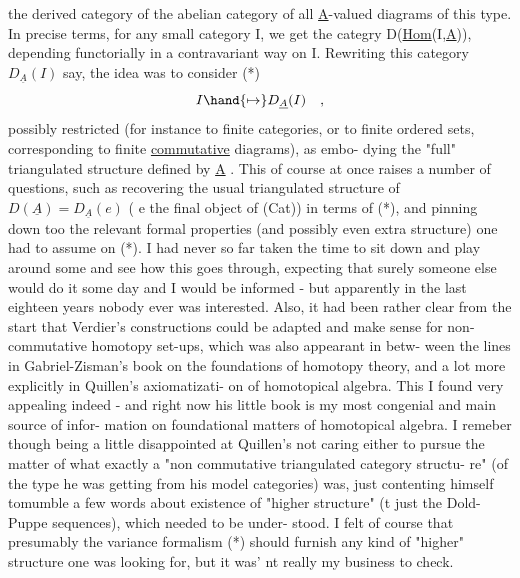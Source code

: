  the derived category of the abelian category of all \underline{A}-valued diagrams
of this type. In precise terms, for any small category I, we get
the categry D(\underline{Hom}(I,\underline{A})), depending functorially in a contravariant
way on I. Rewriting this category $D_{\underline{A}}(I)$ say, the idea was to consider
(*) \[ I \hand{\mapsto} D_{\underline{A}}(I) \quad , \]
possibly  restricted  (for instance to finite categories, or to finite
ordered sets, corresponding to finite \uline{commutative} diagrams), as embo-%
dying the "full" triangulated structure defined by \underline{A} . This of course
at once raises a number of questions, such as recovering the usual
triangulated structure of $D(\underline{A}) = D_{\underline{A}}(e)$ ( e the final object of (Cat))
in terms of (*), and pinning down too the relevant formal properties
(and possibly even extra structure) one had to assume on (*). I had
never so far taken the time to sit down and play around some and see
how this goes through, expecting that surely someone else would do it
some day and I would be informed - but apparently in the last eighteen
years nobody ever was interested. Also, it had been rather clear from
the start that Verdier's constructions could be adapted and  make sense
for non-commutative homotopy set-ups, which was also appearant in betw-%
ween the lines in Gabriel-Zisman's  book on the foundations
of homotopy theory, and a lot more explicitly in Quillen's axiomatizati-%
on of homotopical algebra. This  I found very appealing indeed - and
right now  his little book is my most congenial and main source of infor-%
mation on foundational matters of homotopical algebra. I remeber though
 being a little disappointed at Quillen's not caring either to pursue the
matter of what exactly a "non commutative triangulated category structu-%
re" (of the type he was getting from his model categories) was, just
contenting himself tomumble a few words about existence of "higher
structure" (t just the Dold-Puppe sequences), which  needed to be under-%
stood. I felt of course that presumably the variance formalism (*) should
furnish any kind of "higher" structure one was looking for, but it was'
nt really my business to check.


